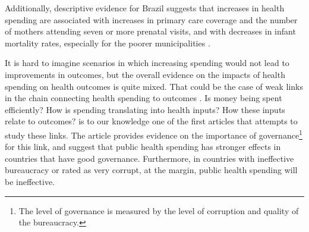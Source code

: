 Additionally, descriptive evidence for Brazil suggests that increases in health spending are associated with increases in primary care coverage and the number of mothers attending seven or more prenatal visits, and with decreases in infant mortality rates, especially for the poorer municipalities \citep{paixao2012,Castro2019}. 

It is hard to imagine scenarios in which increasing spending would not lead to improvements in outcomes, but the overall evidence on the impacts of health spending on health outcomes is quite mixed. That could be the case of weak links in the chain connecting health spending to outcomes \citep{filmer2000weak}. Is money being spent efficiently? How is spending translating into health inputs? How these inputs relate to outcomes? \cite{Rajkumar2008} is to our knowledge one of the first articles that attempts to study these links. The article provides evidence on the importance of governance\footnote{The level of governance is measured by the level of corruption and quality of the bureaucracy.} for this link, and suggest that public health spending has stronger effects in countries that have good governance. Furthermore, in countries with ineffective bureaucracy or rated as very corrupt, at the margin, public health spending will be ineffective.